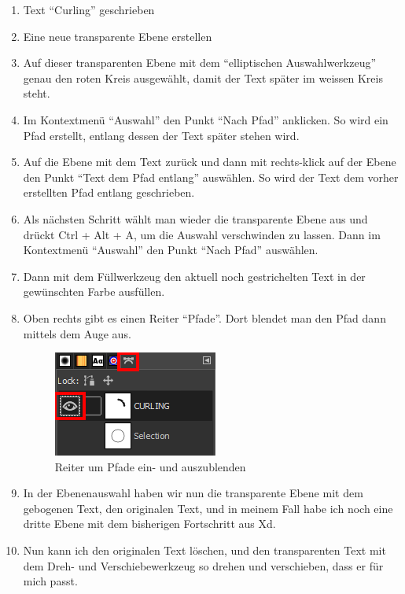 \documentclass[11pt]{article}
\begin{document}
    \begin{enumerate}
        \item Text ``Curling'' geschrieben
        \item Eine neue transparente Ebene erstellen
        \item Auf dieser transparenten Ebene mit dem ``elliptischen Auswahlwerkzeug'' genau den roten Kreis ausgewählt,
        damit der Text später im weissen Kreis steht.
        \item Im Kontextmenü ``Auswahl'' den Punkt ``Nach Pfad'' anklicken. So wird ein Pfad erstellt, entlang dessen
        der Text später stehen wird.
        \item Auf die Ebene mit dem Text zurück und dann mit rechts-klick auf der Ebene den Punkt ``Text dem Pfad entlang''
        auswählen. So wird der Text dem vorher erstellten Pfad entlang geschrieben.
        \item Als nächsten Schritt wählt man wieder die transparente Ebene aus und drückt Ctrl + Alt + A, um die Auswahl
        verschwinden zu lassen. Dann im Kontextmenü ``Auswahl'' den Punkt ``Nach Pfad'' auswählen.
        \item Dann mit dem Füllwerkzeug den aktuell noch gestrichelten Text in der gewünschten Farbe ausfüllen.
        \item Oben rechts gibt es einen Reiter ``Pfade''. Dort blendet man den Pfad dann mittels dem Auge aus.

        \begin{figure}[h]
            \centering
            \includegraphics{media/paths}
            \caption{Reiter um Pfade ein- und auszublenden}
        \end{figure}

        \item In der Ebenenauswahl haben wir nun die transparente Ebene mit dem gebogenen Text, den originalen Text,
        und in meinem Fall habe ich noch eine dritte Ebene mit dem bisherigen Fortschritt aus Xd.
        \item Nun kann ich den originalen Text löschen, und den transparenten Text mit dem Dreh- und Verschiebewerkzeug
        so drehen und verschieben, dass er für mich passt.
    \end{enumerate}
\end{document}
